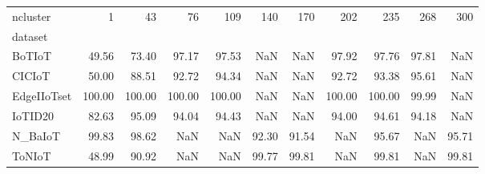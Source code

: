 \begin{tabular}{lrrrrrrrrrr}
\toprule
ncluster & 1 & 43 & 76 & 109 & 140 & 170 & 202 & 235 & 268 & 300 \\
dataset &  &  &  &  &  &  &  &  &  &  \\
\midrule
BoTIoT & 49.56 & 73.40 & 97.17 & 97.53 & NaN & NaN & 97.92 & 97.76 & 97.81 & NaN \\
CICIoT & 50.00 & 88.51 & 92.72 & 94.34 & NaN & NaN & 92.72 & 93.38 & 95.61 & NaN \\
EdgeIIoTset & 100.00 & 100.00 & 100.00 & 100.00 & NaN & NaN & 100.00 & 100.00 & 99.99 & NaN \\
IoTID20 & 82.63 & 95.09 & 94.04 & 94.43 & NaN & NaN & 94.00 & 94.61 & 94.18 & NaN \\
N_BaIoT & 99.83 & 98.62 & NaN & NaN & 92.30 & 91.54 & NaN & 95.67 & NaN & 95.71 \\
ToNIoT & 48.99 & 90.92 & NaN & NaN & 99.77 & 99.81 & NaN & 99.81 & NaN & 99.81 \\
\bottomrule
\end{tabular}

